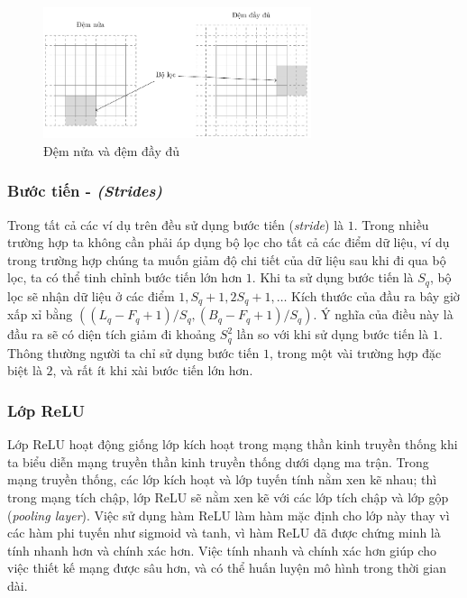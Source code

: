 \begin{figure}[htb]
    \centering
    \includegraphics[width=0.7\textwidth]{tikz_image/cnn_padding.pdf}
    \caption{Đệm nửa và đệm đầy đủ}
    \label{figure:cnn-padding}
\end{figure}

\subsubsection{Bước tiến - \textit{(Strides)}}
Trong tất cả các ví dụ trên đều sử dụng bước tiến (\textit{stride}) là $1$. Trong nhiều trường hợp ta không cần phải áp dụng bộ lọc cho tất cả các điểm dữ liệu, ví dụ trong trường hợp chúng ta muốn giảm độ chi tiết của dữ liệu sau khi đi qua bộ lọc, ta có thể tinh chỉnh bước tiến lớn hơn $1$. Khi ta sử dụng bước tiến là $S_q$, bộ lọc sẽ nhận dữ liệu ở các điểm $1,S_q+1,2S_q+1,\dots$ Kích thước của đầu ra bây giờ xấp xỉ bằng $\left((L_q-F_q+1)/S_q,(B_q-F_q+1)/S_q\right)$. Ý nghĩa của điều này là đầu ra sẽ có diện tích giảm đi khoảng $S_q^2$ lần so với khi sử dụng bước tiến là $1$. Thông thường người ta chỉ sử dụng bước tiến $1$, trong một vài trường hợp đặc biệt là $2$, và rất ít khi xài bước tiến lớn hơn.

\subsubsection{Lớp ReLU}
Lớp ReLU hoạt động giống lớp kích hoạt trong mạng thần kinh truyền thống khi ta biểu diễn mạng truyền thần kinh truyền thống dưới dạng ma trận. Trong mạng truyền thống, các lớp kích hoạt và lớp tuyến tính nằm xen kẽ nhau; thì trong mạng tích chập, lớp ReLU sẽ nằm xen kẽ với các lớp tích chập và lớp gộp (\textit{pooling layer}). Việc sử dụng hàm ReLU làm hàm mặc định cho lớp này thay vì các hàm phi tuyến như sigmoid và tanh, vì hàm ReLU đã được chứng minh là tính nhanh hơn và chính xác hơn. Việc tính nhanh và chính xác hơn giúp cho việc thiết kế mạng được sâu hơn, và có thể huấn luyện mô hình trong thời gian dài.

